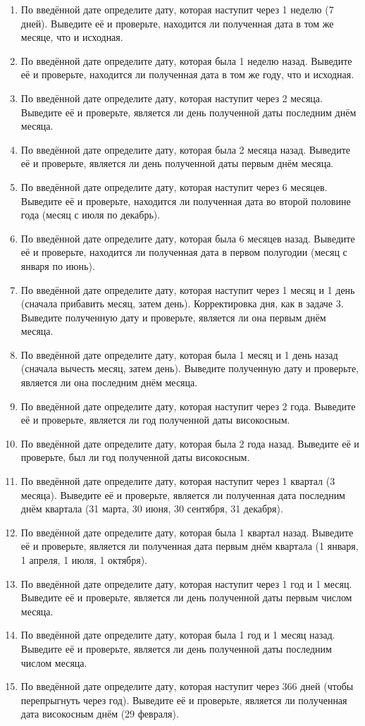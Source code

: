 \begin{enumerate}
    \item По введённой дате определите дату, которая наступит через 1 неделю (7 дней). Выведите её и проверьте, находится ли полученная дата в том же месяце, что и исходная.
    \item По введённой дате определите дату, которая была 1 неделю назад. Выведите её и проверьте, находится ли полученная дата в том же году, что и исходная.
    \item По введённой дате определите дату, которая наступит через 2 месяца. Выведите её и проверьте, является ли день полученной даты последним днём месяца.
    \item По введённой дате определите дату, которая была 2 месяца назад. Выведите её и проверьте, является ли день полученной даты первым днём месяца.
    \item По введённой дате определите дату, которая наступит через 6 месяцев. Выведите её и проверьте, находится ли полученная дата во второй половине года (месяц с июля по декабрь).
    \item По введённой дате определите дату, которая была 6 месяцев назад. Выведите её и проверьте, находится ли полученная дата в первом полугодии (месяц с января по июнь).
    \item По введённой дате определите дату, которая наступит через 1 месяц и 1 день (сначала прибавить месяц, затем день). Корректировка дня, как в задаче 3. Выведите полученную дату и проверьте, является ли она первым днём месяца.
    \item По введённой дате определите дату, которая была 1 месяц и 1 день назад (сначала вычесть месяц, затем день). Выведите полученную дату и проверьте, является ли она последним днём месяца.
    \item По введённой дате определите дату, которая наступит через 2 года. Выведите её и проверьте, является ли год полученной даты високосным.
    \item По введённой дате определите дату, которая была 2 года назад. Выведите её и проверьте, был ли год полученной даты високосным.
    \item По введённой дате определите дату, которая наступит через 1 квартал (3 месяца). Выведите её и проверьте, является ли полученная дата последним днём квартала (31 марта, 30 июня, 30 сентября, 31 декабря).
    \item По введённой дате определите дату, которая была 1 квартал назад. Выведите её и проверьте, является ли полученная дата первым днём квартала (1 января, 1 апреля, 1 июля, 1 октября).
    \item По введённой дате определите дату, которая наступит через 1 год и 1 месяц. Выведите её и проверьте, является ли день полученной даты первым числом месяца.
    \item По введённой дате определите дату, которая была 1 год и 1 месяц назад. Выведите её и проверьте, является ли день полученной даты последним числом месяца.
    \item По введённой дате определите дату, которая наступит через 366 дней (чтобы перепрыгнуть через год). Выведите её и проверьте, является ли полученная дата високосным днём (29 февраля).
\end{enumerate}




